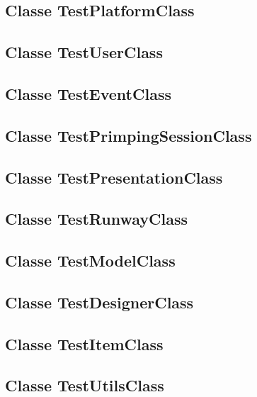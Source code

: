 \documentclass{article}
\begin{document}
\subsection{Classe TestPlatformClass}


\subsection{Classe TestUserClass}


\subsection{Classe TestEventClass}


\subsection{Classe TestPrimpingSessionClass}


\subsection{Classe TestPresentationClass}


\subsection{Classe TestRunwayClass}


\subsection{Classe TestModelClass}


\subsection{Classe TestDesignerClass}


\subsection{Classe TestItemClass}


\subsection{Classe TestUtilsClass}

\end{document}
